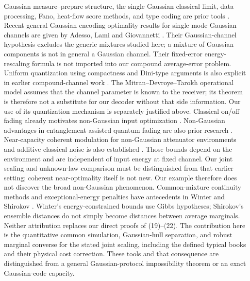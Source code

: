 \documentclass[11pt]{article}
\begin{document}
Gaussian measure--prepare structure, the single Gaussian classical
limit, data processing, Fano, heat-flow score methods, and type coding
are prior tools \cite{holevoEB,holevoReview,types,compound}.
Recent general Gaussian-encoding optimality results for single-mode
Gaussian channels are given by Adesso, Lami and Giovannetti
\cite{adesso2026}. Their Gaussian-channel hypothesis excludes the
generic mixtures studied here; a mixture of Gaussian components is not
in general a Gaussian channel. Their fixed-error energy-rescaling
formula is not imported into our compound average-error problem.
Uniform quantization using compactness and Dini-type arguments is also
explicit in earlier compound-channel work \cite{mitran,schaefer}.
The Mitran--Devroye--Tarokh operational model assumes that the channel
parameter is known to the receiver; its theorem is therefore not a
substitute for our decoder without that side information.
Our use of its quantization mechanism is separately justified above.
Classical on/off fading already motivates non-Gaussian input
optimization \cite{tu}. Non-Gaussian advantages in entanglement-assisted
quantum fading are also prior research \cite{catalano}.
Near-capacity coherent modulation for non-Gaussian attenuator environments
and additive classical noise is also established \cite{huber}.
Those bounds depend on the environment and are independent of input
energy at fixed channel. Our joint scaling and unknown-law comparison
must be distinguished from that earlier setting; coherent near-optimality
itself is not new. Our example therefore does not discover the broad
non-Gaussian phenomenon.
Common-mixture continuity methods and exceptional-energy penalties have
antecedents in Winter \cite{winter} and Shirokov \cite{shirokov}.
Winter's energy-constrained bounds use Gibbs hypotheses; Shirokov's
ensemble distances do not simply become distances between average
marginals. Neither attribution replaces our direct proofs of (19)--(22).
The contribution here is the quantitative common simulation, Gaussian-hull
separation, and robust marginal converse for the stated joint scaling,
including the defined typical books and their physical cost correction.
These tools and that consequence are distinguished from a general
Gaussian-protocol impossibility theorem or an exact Gaussian-code capacity.
\end{document}
